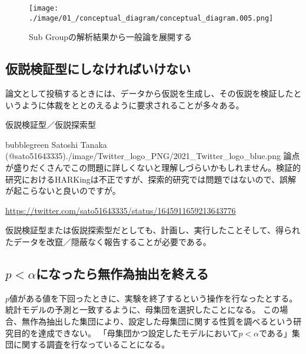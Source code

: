 
\begin{figure}
 \begin{center}
  \texttt{[image: ./image/01\_/conceptual\_diagram/conceptual\_diagram.005.png]}
  \caption{Sub Groupの解析結果から一般論を展開する}
  \label{fig:conceptual_diagram_HARKing}
 \end{center}
\end{figure}


\subsection{仮説検証型にしなければいけない}
論文として投稿するときには、データから仮説を生成し、その仮説を検証したというように体裁をととのえるように要求されることが多々ある。

\begin{SMbox}{仮説検証型／仮説探索型}

\begin{rightbubbles}{bubblegreen}{
 Satoshi Tanaka (@sato51643335)}{./image/Twitter_logo_PNG/2021_Twitter_logo_blue.png}
 論点が盛りだくさんでこの問題に詳しくないと理解しづらいかもしれません。検証的研究におけるHARKingは不正ですが、探索的研究では問題ではないので、誤解が起こらないと良いのですが。
 \begin{flushright}
  \small	\url{https://twitter.com/sato51643335/status/1645911659213643776}
 \end{flushright}
\end{rightbubbles}

仮説検証型または仮説探索型だとしても、計画し、実行したことそして、得られたデータを改竄／隠蔽なく報告することが必要である。

\end{SMbox}



\subsection{$p<\alpha$になったら無作為抽出を終える}
$p$値がある値を下回ったときに、実験を終了するという操作を行なったとする。
統計モデルの予測と一致するように、母集団を選択したことになる。
この場合、無作為抽出した集団により、設定した母集団に関する性質を調べるという研究目的を達成できない。
「母集団かつ設定したモデルにおいて$p<\alpha$である」集団に関する調査を行なっていることになる。


